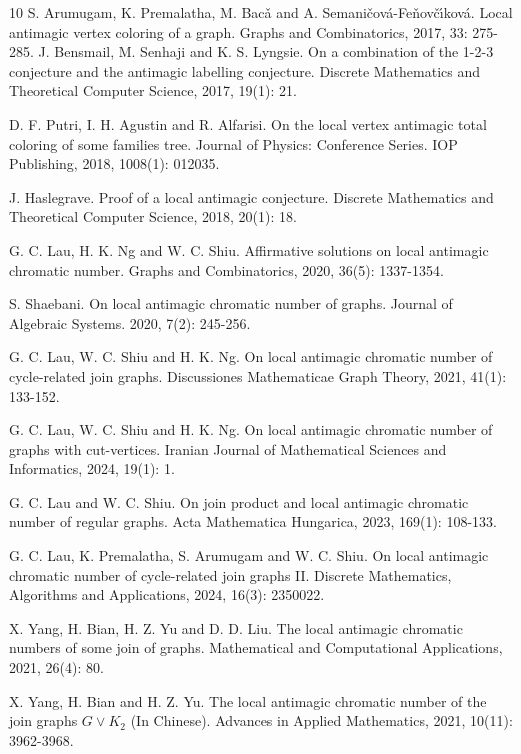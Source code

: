 \documentclass[12pt]{article}
\begin{document}
\begin{thebibliography}{10}
 S. Arumugam, K. Premalatha, M. Bac\v{a} and A. Semani\v{c}ov\'{a}-Fe\v{n}ov\v{c}\'{\i}kov\'{a}. Local antimagic vertex coloring of a graph. Graphs and  Combinatorics, 2017, 33: 275-285.
 J. Bensmail, M. Senhaji and K. S. Lyngsie. On a combination of the 1-2-3 conjecture and the antimagic labelling conjecture. Discrete Mathematics and Theoretical Computer Science, 2017, 19(1): 21.

D. F. Putri, I. H. Agustin and R. Alfarisi. On the local vertex antimagic total coloring of some families tree. Journal of Physics: Conference Series. IOP Publishing, 2018, 1008(1): 012035.

 J. Haslegrave. Proof of a local antimagic conjecture. Discrete Mathematics and Theoretical Computer Science, 2018, 20(1): 18.

 G. C. Lau, H. K. Ng and W. C. Shiu. Affirmative solutions on local antimagic chromatic number. Graphs and Combinatorics, 2020, 36(5): 1337-1354.

 S. Shaebani. On local antimagic chromatic number of graphs. Journal of Algebraic Systems. 2020, 7(2): 245-256.

 G. C. Lau, W. C. Shiu and H. K. Ng. On local antimagic chromatic number of cycle-related join graphs. Discussiones Mathematicae Graph Theory, 2021, 41(1): 133-152.

 G. C. Lau, W. C. Shiu and H. K. Ng. On local antimagic chromatic number of graphs with cut-vertices. Iranian Journal of Mathematical Sciences and Informatics, 2024, 19(1): 1. %

 G. C. Lau and W. C. Shiu. On join product and local antimagic chromatic number of regular graphs. Acta Mathematica Hungarica, 2023, 169(1): 108-133. %

 G. C. Lau, K. Premalatha, S. Arumugam and W. C. Shiu. On local antimagic chromatic number of cycle-related join graphs II. Discrete Mathematics, Algorithms and Applications, 2024, 16(3): 2350022.

 X. Yang, H. Bian, H. Z. Yu and D. D. Liu. The local antimagic chromatic numbers of some join of graphs. Mathematical and Computational Applications, 2021, 26(4): 80.

 X. Yang, H. Bian and H. Z. Yu. The local antimagic chromatic number of the join graphs $G\vee K_{2}$ (In Chinese). Advances in Applied Mathematics, 2021, 10(11): 3962-3968.


\end{thebibliography}
\end{document}
